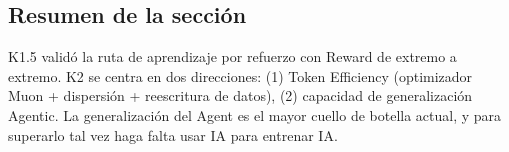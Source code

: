 \subsection{Resumen de la sección}

K1.5 validó la ruta de aprendizaje por refuerzo con Reward de extremo a extremo. K2 se centra en dos direcciones: (1) Token Efficiency (optimizador Muon + dispersión + reescritura de datos), (2) capacidad de generalización Agentic. La generalización del Agent es el mayor cuello de botella actual, y para superarlo tal vez haga falta usar IA para entrenar IA.

